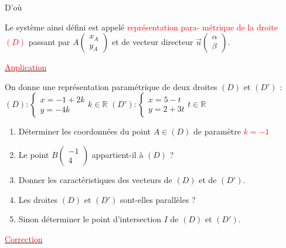 \documentclass[12pt,a4paper]{article}
\begin{document}
\noindent D'où \enspace {}

\vspace{0.5cm}

Le système ainsi défini est appelé \textcolor{red}{représentation para-} \textcolor{red}{métrique de la droite $(D)$} passant par $A \begin{pmatrix} x_A \\ y_A \end{pmatrix}$ et de vecteur directeur $\vec{u} \begin{pmatrix} \alpha \\ \beta \end{pmatrix}$.

\begin{center}
    \underline{\textcolor{red}{Application}}
\end{center}

On donne une représentation paramétrique de deux droites $(D)$ et $(D')$ :
$(D) : \begin{cases} x = -1 + 2k \\ y = -4k \end{cases} k \in \mathbb{R}$ \quad $(D') : \begin{cases} x = 5 - t \\ y = 2 + 3t \end{cases} t \in \mathbb{R}$

\begin{enumerate}
    \item Déterminer les coordonnées du point $A \in (D)$ de paramètre \textcolor{red}{$k = -1$}
    \item Le point $B \begin{pmatrix} -1 \\ 4 \end{pmatrix}$ appartient-il à $(D)$ ?
    \item Donner les caractéristiques des vecteurs de $(D)$ et de $(D')$.
    \item Les droites $(D)$ et $(D')$ sont-elles parallèles ?
    \item Sinon déterminer le point d'intersection $I$ de $(D)$ et $(D')$.
\end{enumerate}

\begin{center}
    \underline{\textcolor{red}{Correction}}
\end{center}
\end{document}
